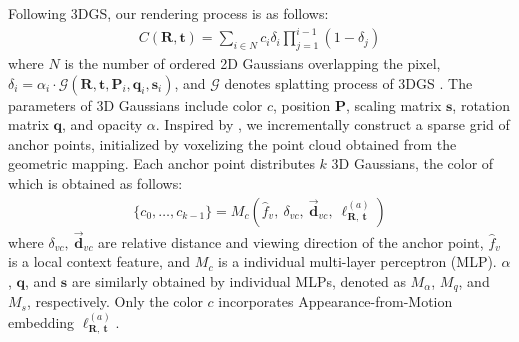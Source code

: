 Following 3DGS, our rendering process is as follows:
\begin{align}
    C(\mathrm{\mathbf{R}},\mathrm{\mathbf{t}}) = \sum_{i\in N} c_i \delta_i \prod_{j=1}^{i-1}(1 - \delta_j)
  \label{eq:rendering}    
\end{align}
where $N$ is the number of ordered 2D Gaussians overlapping the pixel, $\delta_i = \alpha_i \cdot \mathcal{G}(\mathrm{\mathbf{R}},\mathrm{\mathbf{t}}, \mathrm{\mathbf{P}}_i, \mathrm{\mathbf{q}}_i, \mathrm{\mathbf{s}}_i)$, and $\mathcal{G}$ denotes splatting process of 3DGS \cite{3DGS2023}.  The parameters of 3D Gaussians include color $c$, position $\mathrm{\mathbf{P}}$, scaling matrix $\mathrm{\mathbf{s}}$, rotation matrix $\mathrm{\mathbf{q}}$, and opacity $\alpha$. Inspired by \cite{Scaffold-GS2024}, we incrementally construct a sparse grid of anchor points, initialized by voxelizing the point cloud obtained from the geometric mapping. Each anchor point distributes $k$ 3D Gaussians, the color of which is obtained as follows:
\begin{align}
\{c_0,\dots,c_{k-1}\} = M_c(\hat{f}_v,\ \delta_{vc},\ \vec{\mathrm{\mathbf{d}}}_{vc},\ \bm{\ell}^{(a)}_{\mathrm{\mathbf{R}},\ \mathrm{\mathbf{t}}})
\end{align}
where $\delta_{vc},\  \vec{\mathrm{\mathbf{d}}}_{vc}$ are relative distance and viewing direction of the anchor point, $\hat{f}_v$ is a local context feature, and $M_c$ is a individual multi-layer perceptron (MLP). $\alpha$, $\mathrm{\mathbf{q}}$, and $\mathrm{\mathbf{s}}$ are similarly obtained by individual MLPs, denoted as \(M_\alpha\), \(M_q\), and \(M_s\), respectively. Only the color $c$ incorporates Appearance-from-Motion embedding $\bm{\ell}^{(a)}_{\mathrm{\mathbf{R}},\ \mathrm{\mathbf{t}}}$. %



